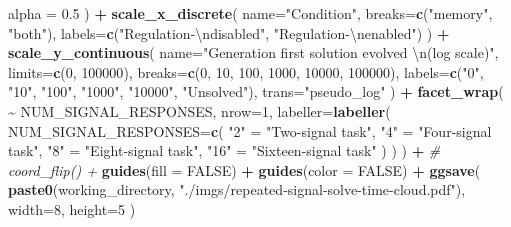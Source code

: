 \documentclass[
]{book}
\newenvironment{Shaded}{\begin{snugshade}}{\end{snugshade}}
\newcommand{\CharTok}[1]{\textcolor[rgb]{0.31,0.60,0.02}{#1}}
\newcommand{\CommentTok}[1]{\textcolor[rgb]{0.56,0.35,0.01}{\textit{#1}}}
\newcommand{\DataTypeTok}[1]{\textcolor[rgb]{0.13,0.29,0.53}{#1}}
\newcommand{\DecValTok}[1]{\textcolor[rgb]{0.00,0.00,0.81}{#1}}
\newcommand{\FloatTok}[1]{\textcolor[rgb]{0.00,0.00,0.81}{#1}}
\newcommand{\KeywordTok}[1]{\textcolor[rgb]{0.13,0.29,0.53}{\textbf{#1}}}
\newcommand{\NormalTok}[1]{#1}
\newcommand{\OperatorTok}[1]{\textcolor[rgb]{0.81,0.36,0.00}{\textbf{#1}}}
\newcommand{\OtherTok}[1]{\textcolor[rgb]{0.56,0.35,0.01}{#1}}
\newcommand{\StringTok}[1]{\textcolor[rgb]{0.31,0.60,0.02}{#1}}
\begin{document}
\begin{Shaded}
\begin{Highlighting}[]
    \DataTypeTok{alpha =} \FloatTok{0.5}
\NormalTok{  ) }\OperatorTok{+}
\StringTok{  }\KeywordTok{scale\_x\_discrete}\NormalTok{(}
    \DataTypeTok{name=}\StringTok{"Condition"}\NormalTok{,}
    \DataTypeTok{breaks=}\KeywordTok{c}\NormalTok{(}\StringTok{"memory"}\NormalTok{, }\StringTok{"both"}\NormalTok{),}
    \DataTypeTok{labels=}\KeywordTok{c}\NormalTok{(}\StringTok{"Regulation{-}}\CharTok{\textbackslash{}n}\StringTok{disabled"}\NormalTok{, }\StringTok{"Regulation{-}}\CharTok{\textbackslash{}n}\StringTok{enabled"}\NormalTok{)}
\NormalTok{  ) }\OperatorTok{+}
\StringTok{  }\KeywordTok{scale\_y\_continuous}\NormalTok{(}
    \DataTypeTok{name=}\StringTok{"Generation first solution evolved }\CharTok{\textbackslash{}n}\StringTok{(log scale)"}\NormalTok{,}
    \DataTypeTok{limits=}\KeywordTok{c}\NormalTok{(}\DecValTok{0}\NormalTok{, }\DecValTok{100000}\NormalTok{),}
    \DataTypeTok{breaks=}\KeywordTok{c}\NormalTok{(}\DecValTok{0}\NormalTok{, }\DecValTok{10}\NormalTok{, }\DecValTok{100}\NormalTok{, }\DecValTok{1000}\NormalTok{, }\DecValTok{10000}\NormalTok{, }\DecValTok{100000}\NormalTok{),}
    \DataTypeTok{labels=}\KeywordTok{c}\NormalTok{(}\StringTok{"0"}\NormalTok{, }\StringTok{"10"}\NormalTok{, }\StringTok{"100"}\NormalTok{, }\StringTok{"1000"}\NormalTok{, }\StringTok{"10000"}\NormalTok{, }\StringTok{"Unsolved"}\NormalTok{),}
    \DataTypeTok{trans=}\StringTok{"pseudo\_log"}
\NormalTok{  ) }\OperatorTok{+}
\StringTok{  }\KeywordTok{facet\_wrap}\NormalTok{(}
    \OperatorTok{\textasciitilde{}}\StringTok{ }\NormalTok{NUM\_SIGNAL\_RESPONSES,}
    \DataTypeTok{nrow=}\DecValTok{1}\NormalTok{,}
    \DataTypeTok{labeller=}\KeywordTok{labeller}\NormalTok{(}
      \DataTypeTok{NUM\_SIGNAL\_RESPONSES=}\KeywordTok{c}\NormalTok{(}
        \StringTok{"2"}\NormalTok{ =}\StringTok{ "Two{-}signal task"}\NormalTok{,}
        \StringTok{"4"}\NormalTok{ =}\StringTok{ "Four{-}signal task"}\NormalTok{,}
        \StringTok{"8"}\NormalTok{ =}\StringTok{ "Eight{-}signal task"}\NormalTok{,}
        \StringTok{"16"}\NormalTok{ =}\StringTok{ "Sixteen{-}signal task"}
\NormalTok{      )}
\NormalTok{    )}
\NormalTok{  ) }\OperatorTok{+}
\StringTok{  }\CommentTok{\# coord\_flip() +}
\StringTok{  }\KeywordTok{guides}\NormalTok{(}\DataTypeTok{fill =} \OtherTok{FALSE}\NormalTok{) }\OperatorTok{+}
\StringTok{  }\KeywordTok{guides}\NormalTok{(}\DataTypeTok{color =} \OtherTok{FALSE}\NormalTok{) }\OperatorTok{+}
\StringTok{  }\KeywordTok{ggsave}\NormalTok{(}
    \KeywordTok{paste0}\NormalTok{(working\_directory, }\StringTok{"./imgs/repeated{-}signal{-}solve{-}time{-}cloud.pdf"}\NormalTok{),}
    \DataTypeTok{width=}\DecValTok{8}\NormalTok{,}
    \DataTypeTok{height=}\DecValTok{5}
\NormalTok{  )}
\end{Highlighting}
\end{Shaded}
\end{document}
